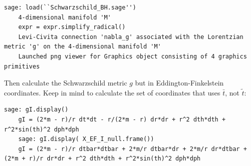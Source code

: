 \documentclass[10pt]{amsart}
\begin{document}
\begin{multicols*}{2}
	\begin{lstlisting}[frame=single]
	sage: load(``Schwarzschild_BH.sage'')
	4-dimensional manifold 'M'
	expr = expr.simplify_radical()
	Levi-Civita connection 'nabla_g' associated with the Lorentzian metric 'g' on the 4-dimensional manifold 'M'
	Launched png viewer for Graphics object consisting of 4 graphics primitives
	\end{lstlisting}
	
	Then calculate the Schwarzschild metric $g$ but in Eddington-Finkelstein coordinates.  Keep in mind to calculate the set of coordinates that uses $\bar{t}$, not $\widetilde{t}$: 
	
	\begin{lstlisting}[frame=single]
	sage: gI.display()
	gI = (2*m - r)/r dt*dt - r/(2*m - r) dr*dr + r^2 dth*dth + r^2*sin(th)^2 dph*dph
	sage: gI.display( X_EF_I_null.frame())
	gI = (2*m - r)/r dtbar*dtbar + 2*m/r dtbar*dr + 2*m/r dr*dtbar + (2*m + r)/r dr*dr + r^2 dth*dth + r^2*sin(th)^2 dph*dph
	\end{lstlisting}




\end{multicols*}
\end{document}
